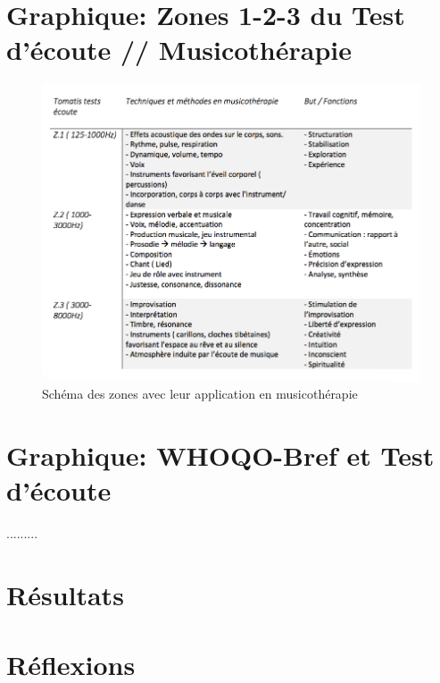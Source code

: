  





      


\section{Graphique: Zones 1-2-3 du Test d'écoute // Musicothérapie}


        \begin{figure}
	\centering
	\includegraphics[width=1\linewidth]{images/testtechnmethbut}
	\caption[Zones du test avec la musicothérapie]{Schéma des
          zones avec leur application en musicothérapie}
       
	\label{testbutetfonction}
\end{figure}



 


\section{Graphique:  WHOQO-Bref et Test d'écoute}

.........


\section{Résultats}



\section{Réflexions}

